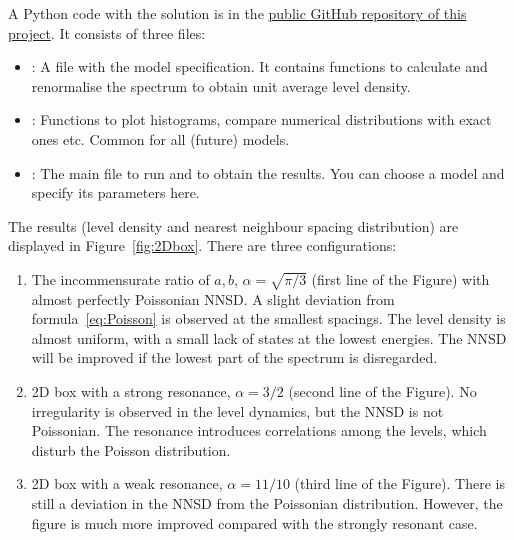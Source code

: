 \documentclass[a4paper,11pt,twoside]{article}
\begin{document}
        \begin{solution}
            A Python code with the solution is in the \href{https://github.com/PavelStransky/Chaos/python}{public GitHub repository of this project}.
            It consists of three files: 
            \begin{itemize}
                \item 
                    : A file with the model specification. 
                    It contains functions to calculate and renormalise the spectrum to obtain unit average level density.
                \item
                    : Functions to plot histograms, compare numerical distributions with exact ones etc.
                    Common for all (future) models.
                \item
                    : The main file to run and to obtain the results.
                    You can choose a model and specify its parameters here.
            \end{itemize}
            The results (level density and nearest neighbour spacing distribution) are displayed in Figure~\ref{fig:2Dbox}.
            There are three configurations:
            \begin{enumerate}
                \item 
                    The incommensurate ratio of $a,b$, $\alpha=\sqrt{\pi/3}$ (first line of the Figure) with almost perfectly Poissonian NNSD. 
                    A slight deviation from formula~\eqref{eq:Poisson} is observed at the smallest spacings.
                    The level density is almost uniform, with a small lack of states at the lowest energies.
                    The NNSD will be improved if the lowest part of the spectrum is disregarded.
                \item
                    2D box with a strong resonance, $\alpha=3/2$ (second line of the Figure).
                    No irregularity is observed in the level dynamics, but the NNSD is not Poissonian.
                    The resonance introduces correlations among the levels, which disturb the Poisson distribution.
                \item
                    2D box with a weak resonance, $\alpha=11/10$ (third line of the Figure).
                    There is still a deviation in the NNSD from the Poissonian distribution.
                    However, the figure is much more improved compared with the strongly resonant case. 
            \end{enumerate}


\end{solution}
\end{document}

